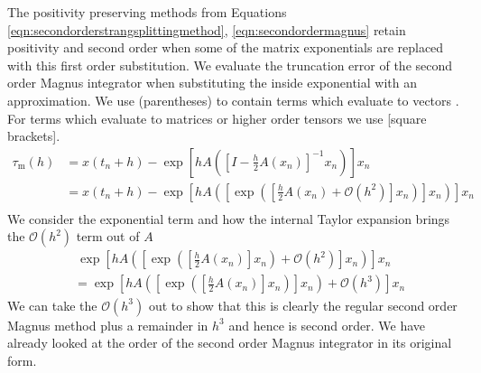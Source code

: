 The positivity preserving methods from Equations \ref{eqn:secondorderstrangsplittingmethod}, \ref{eqn:secondordermagnus} retain positivity and second order when some of the matrix exponentials are replaced with this first order substitution.
We evaluate the truncation error of the second order Magnus integrator when substituting the inside exponential with an approximation.
We use (parentheses) to contain terms which evaluate to vectors . For terms which evaluate to matrices or higher order tensors we use [square brackets].
\begin{equation*}
    \begin{aligned}
        \tau_\mathrm{m}(h) &= x(t_n + h) - \exp \left[
            h A \left(
                \left[
                    I - \frac{h}{2}A(x_n)
                \right]^{-1} x_n
            \right)
        \right]x_n \\
        &= x(t_n + h) - \exp \left[
            h A \left(
                \left[
                    \exp \left(
                        \left[
                            \frac{h}{2}A(x_n) + \mathcal{O}(h^2)
                        \right] x_n
                    \right)
                \right] x_n
            \right)
        \right]x_n \\
    \end{aligned}
\end{equation*}
We consider the exponential term and how the internal Taylor expansion brings the $\mathcal{O}(h^2)$ term out of $A$
\begin{equation*}
    \begin{aligned}
        &~ \exp \left[
            h A \left(
                \left[
                    \exp \left(
                        \left[
                            \frac{h}{2}A(x_n)
                        \right] x_n
                    \right) + \mathcal{O}(h^2)
                \right] x_n
            \right)
        \right]x_n \\
        &= \exp \left[
            h A \left(
                \left[
                    \exp \left(
                        \left[
                            \frac{h}{2}A(x_n)
                        \right] x_n
                    \right)
                \right] x_n
            \right) + \mathcal{O}(h^3)
        \right]x_n
    \end{aligned}
\end{equation*}
We can take the $\mathcal{O}(h^3)$ out to show that this is clearly the regular second order Magnus method plus a remainder in $h^3$ and hence is second order.
We have already looked at the order of the second order Magnus integrator in its original form. 

